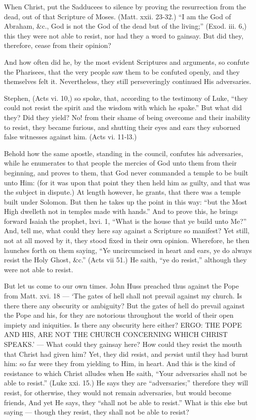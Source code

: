 When Christ, put the Sadducees to silence by proving the resurrection from the dead, out of that Scripture of Moses. (Matt. xxii. 23-32.) “I am the God of Abraham, \&c., God is not the God of the dead but of the living;” (Exod. iii. 6,) this they were not able to resist, nor had they a word to gainsay. But did they, therefore, cease from their opinion?

And how often did he, by the most evident Scriptures and arguments, so confute the Pharisees, that the very people saw them to be confuted openly, and they themselves felt it. Nevertheless, they still perseveringly continued His adversaries.

Stephen, (Acts vi. 10,) so spoke, that, according to the testimony of Luke, “they could not resist the spirit and the wisdom with which he spake.” But what did they? Did they yield? No! from their shame of being overcome and their inability to resist, they became furious, and shutting their eyes and ears they suborned false witnesses against him. (Acts vi. 11-l3.)

Behold how the same apostle, standing in the council, confutes his adversaries, while he enumerates to that people the mercies of God unto them from their beginning, and proves to them, that God never commanded a temple to be built unto Him: (for it was upon that point they then held him as guilty, and that was the subject in dispute.) At length however, he grants, that there was a temple built under Solomon. But then he takes up the point in this way: “but the Most High dwelleth not in temples made with hands.” And to prove this, he brings forward Isaiah the prophet, lxvi. 1, “What is the house that ye build unto Me?” And, tell me, what could they here say against a Scripture so manifest? Yet still, not at all moved by it, they stood fixed in their own opinion. Wherefore, he then launches forth on them saying, “Ye uncircumcised in heart and ears, ye do always resist the Holy Ghost, \&c.” (Acts vii 51.) He saith, “ye do resist,” although they were not able to resist.

But let us come to our own times. John Huss preached thus against the Pope from Matt. xvi. 18 — ‘The gates of hell shall not prevail against my church. Is there there any obscurity or ambiguity? But the gates of hell do prevail against the Pope and his, for they are notorious throughout the world of their open impiety and iniquities. Is there any obscurity here either? \textsc{ERGO: THE POPE AND HIS, ARE NOT THE CHURCH CONCERNING WHICH CHRIST SPEAKS}.’ — What could they gainsay here? How could they resist the mouth that Christ had given him? Yet, they did \emph{re}sist, and \emph{per}sist until they had burnt him: so far were they from yielding to Him, in heart. And this is the kind of resistance to which Christ alludes when He saith, “Your adversaries shall not be able to resist.” (Luke xxi. 15.) He says they are “adversaries;” therefore they will resist, for otherwise, they would not remain adversaries, but would become friends, And yet He says, they “shall not be able to resist.” What is this else but saying — though they resist, they shall not be able to resist?

